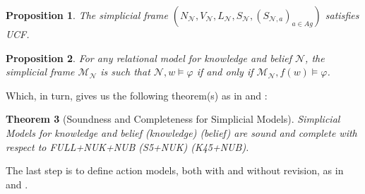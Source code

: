 \documentclass[11pt]{article}
\newtheorem{theorem}{Theorem}[section]
\newtheorem{proposition}[theorem]{Proposition}
\theoremstyle{definition}
\newcommand{\M}{\mathcal{M}}
\renewcommand{\M}{\mathcal{M}}
\newcommand{\N}{\mathcal{N}}
\newcommand{\full}{\textsf{FULL}}
\begin{document}
	\begin{proposition}
		The simplicial frame $(N_{\N},V_{\N},L_{\N},S_{\N},(S_{\N,a})_{a\in Ag})$ satisfies UCF.
	\end{proposition}

	\begin{proposition}
		For any relational model for knowledge and belief $\N$, the simplicial frame $\M_{\N}$ is such that $\N,w\vDash\varphi$ if and only if $\M_\N,f(w)\vDash\varphi$.
	\end{proposition}

	Which, in turn, gives us the following theorem(s) as in \cite{BelSimp} and \cite{SimpBelRev}:
	
	\begin{theorem}[Soundness and Completeness for Simplicial Models]
		Simplicial Models for knowledge and belief (knowledge) (belief) are sound and complete with respect to \full+\textsf{NUK}+\textsf{NUB} (\textsf{S5}+\textsf{NUK}) (\textsf{K45}+\textsf{NUB}).
	\end{theorem}
	
	The last step is to define action models, both with and without revision, as in \cite{SimpAct} and \cite{TechMemo}. 
	
\end{document}
